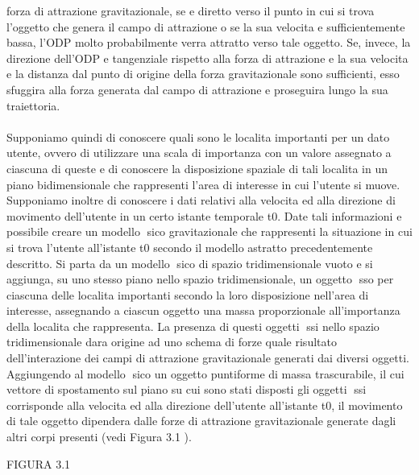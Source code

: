 forza di attrazione gravitazionale, se e diretto verso il punto in cui si trova
l'oggetto che genera il campo di attrazione o se la sua velocita e sufficientemente
bassa, l'ODP molto probabilmente verra attratto verso tale oggetto.
Se, invece, la direzione dell'ODP e tangenziale rispetto alla forza di attrazione
e la sua velocita e la distanza dal punto di origine della forza gravitazionale
sono sufficienti, esso sfuggira alla forza generata dal campo di attrazione e
proseguira lungo la sua traiettoria.\\
\\
Supponiamo quindi di conoscere quali sono le localita importanti per un
dato utente, ovvero di utilizzare una scala di importanza con un valore assegnato
a ciascuna di queste e di conoscere la disposizione spaziale di tali localita
in un piano bidimensionale che rappresenti l'area di interesse in cui l'utente
si muove. Supponiamo inoltre di conoscere i dati relativi alla velocita ed alla
direzione di movimento dell'utente in un certo istante temporale t0. Date tali
informazioni e possibile creare un modello sico gravitazionale che rappresenti
la situazione in cui si trova l'utente all'istante t0 secondo il modello astratto
precedentemente descritto.
Si parta da un modello sico di spazio tridimensionale vuoto e si aggiunga,
su uno stesso piano nello spazio tridimensionale, un oggetto sso per ciascuna
delle localita importanti secondo la loro disposizione nell'area di interesse,
assegnando a ciascun oggetto una massa proporzionale all'importanza della
localita che rappresenta. La presenza di questi oggetti ssi nello spazio tridimensionale
dara origine ad uno schema di forze quale risultato dell'interazione
dei campi di attrazione gravitazionale generati dai diversi oggetti. Aggiungendo
al modello sico un oggetto puntiforme di massa trascurabile, il cui vettore
di spostamento sul piano su cui sono stati disposti gli oggetti ssi corrisponde
alla velocita ed alla direzione dell'utente all'istante t0, il movimento di tale
oggetto dipendera dalle forze di attrazione gravitazionale generate dagli altri
corpi presenti (vedi Figura 3.1 ).

FIGURA 3.1

